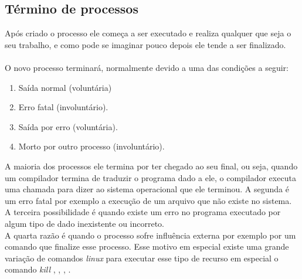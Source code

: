 \subsection{Término de processos}

Após criado o processo ele começa a ser executado e realiza qualquer que seja o seu trabalho, e como pode se imaginar pouco depois ele tende a ser finalizado.\\
\\O novo processo terminará, normalmente devido a uma das condições a seguir:
    \begin{enumerate}
        
        \item Saída normal (voluntária)
        \item Erro fatal (involuntário). 
        \item Saída por erro (voluntária). 
        \item Morto por outro processo (involuntário). 
    \end{enumerate}


A maioria dos processos ele termina por ter chegado ao seu final, ou seja, quando um compilador termina de traduzir o programa dado a ele, o compilador executa uma chamada para dizer ao sistema operacional que ele terminou. A segunda é um erro fatal por exemplo a execução de um arquivo que não existe no sistema. A terceira possibilidade é quando existe um erro no programa executado por algum tipo de dado inexistente ou incorreto.\\
A quarta razão é quando o processo sofre influência externa por exemplo por um comando que finalize esse processo. Esse motivo em especial existe uma grande variação de comandos \emph{linux} para executar esse tipo de recurso em especial o comando \emph{kill} \cite{Tanenbaum2016}, \cite{info2020}, \cite{Morimoto2011}, \cite{Man2020}.

